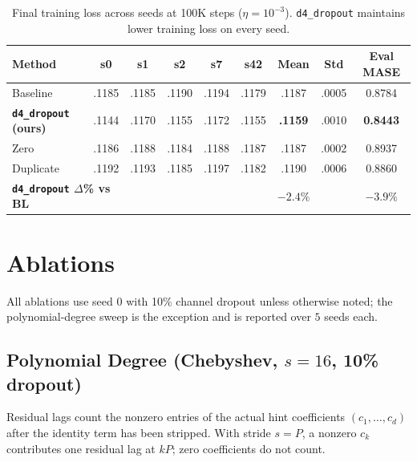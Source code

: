 \documentclass{article}
\begin{document}
\begin{table}[H]
\centering
\caption{Final training loss across seeds at 100K steps ($\eta = 10^{-3}$). \texttt{d4\_dropout} maintains lower training loss on every seed.}
\small
\begin{tabular}{lcccccccc}
\toprule
\textbf{Method} & \textbf{s0} & \textbf{s1} & \textbf{s2} & \textbf{s7} & \textbf{s42} & \textbf{Mean} & \textbf{Std} & \textbf{Eval MASE} \\
\midrule
Baseline & .1185 & .1185 & .1190 & .1194 & .1179 & .1187 & .0005 & 0.8784 \\
\textbf{\texttt{d4\_dropout} (ours)} & .1144 & .1170 & .1155 & .1172 & .1155 & \textbf{.1159} & .0010 & \textbf{0.8443} \\
Zero & .1186 & .1188 & .1184 & .1188 & .1187 & .1187 & .0002 & 0.8937 \\
Duplicate & .1192 & .1193 & .1185 & .1197 & .1182 & .1190 & .0006 & 0.8860 \\
\midrule
\multicolumn{2}{l}{\textbf{\texttt{d4\_dropout} $\Delta$\% vs BL}} & & & & & $-2.4\%$ & & $-3.9\%$ \\
\bottomrule
\end{tabular}
\end{table}

\section{Ablations}
\label{app:ablations}

All ablations use seed 0 with 10\% channel dropout unless otherwise noted; the polynomial-degree sweep is the exception and is reported over $5$ seeds each.

\subsection{Polynomial Degree (Chebyshev, $s=16$, 10\% dropout)}

Residual lags count the nonzero entries of the actual hint coefficients $(c_1,\ldots,c_d)$ after the identity term has been stripped. With stride $s=P$, a nonzero $c_k$ contributes one residual lag at $kP$; zero coefficients do not count.
\end{document}
